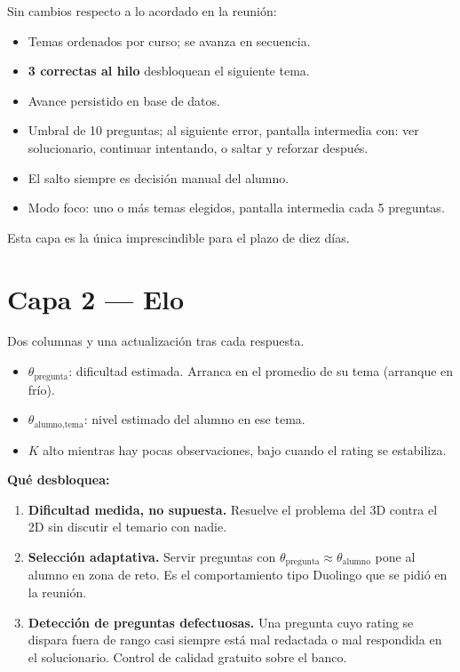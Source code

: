 \documentclass[11pt,a4paper]{article}
\begin{document}
Sin cambios respecto a lo acordado en la reunión:

\begin{itemize}
\item Temas ordenados por curso; se avanza en secuencia.
\item \textbf{3 correctas al hilo} desbloquean el siguiente tema.
\item Avance persistido en base de datos.
\item Umbral de 10 preguntas; al siguiente error, pantalla intermedia con: ver solucionario, continuar intentando, o saltar y reforzar después.
\item El salto siempre es decisión manual del alumno.
\item Modo foco: uno o más temas elegidos, pantalla intermedia cada 5 preguntas.
\end{itemize}

Esta capa es la única imprescindible para el plazo de diez días.

\section{Capa 2 --- Elo}

Dos columnas y una actualización tras cada respuesta.

\begin{itemize}
\item $\theta_{\text{pregunta}}$: dificultad estimada. Arranca en el promedio de su tema (arranque en frío).
\item $\theta_{\text{alumno,tema}}$: nivel estimado del alumno en ese tema.
\item $K$ alto mientras hay pocas observaciones, bajo cuando el rating se estabiliza.
\end{itemize}

\textbf{Qué desbloquea:}

\begin{enumerate}
\item \textbf{Dificultad medida, no supuesta.} Resuelve el problema del 3D contra el 2D sin discutir el temario con nadie.
\item \textbf{Selección adaptativa.} Servir preguntas con $\theta_{\text{pregunta}} \approx \theta_{\text{alumno}}$ pone al alumno en zona de reto. Es el comportamiento tipo Duolingo que se pidió en la reunión.
\item \textbf{Detección de preguntas defectuosas.} Una pregunta cuyo rating se dispara fuera de rango casi siempre está mal redactada o mal respondida en el solucionario. Control de calidad gratuito sobre el banco.
\end{enumerate}
\end{document}
